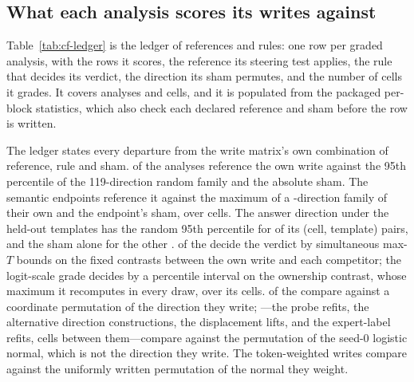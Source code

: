 \documentclass{article}
\begin{document}
\subsection{What each analysis scores its writes against}
\label{app:cf-ledger}

Table~\ref{tab:cf-ledger} is the ledger of references and rules: one row per graded analysis, with the rows it scores, the reference its steering test applies, the rule that decides its verdict, the direction its sham permutes, and the number of cells it grades. It covers \cfLedgerAnalyses{} analyses and \cfLedgerCells{} cells, and it is populated from the packaged per-block statistics, which also check each declared reference and sham before the row is written.

The ledger states every departure from the write matrix's own combination of reference, rule and sham. \cfLedgerFullReference{} of the \cfLedgerAnalyses{} analyses reference the own write against the 95th percentile of the 119-direction random family and the absolute sham. The semantic endpoints reference it against the maximum of a \cfSemLedgerRandom{}-direction family of their own and the endpoint's sham, over \cfSemLedgerCells{} cells. The answer direction under the held-out templates has the random 95th percentile for \cfAnsdirtRefPairs{} of its \cfAnsdirtLedgerPairs{} (cell, template) pairs, and the sham alone for the other \cfAnsdirtShamPairs{}. \cfLedgerMaxT{} of the \cfLedgerAnalyses{} decide the verdict by simultaneous max-$T$ bounds on the fixed contrasts between the own write and each competitor; the logit-scale grade decides by a percentile interval on the ownership contrast, whose maximum it recomputes in every draw, over its \cfLedgerPercentileCells{} cells. \cfLedgerOwnSham{} of the \cfLedgerAnalyses{} compare against a coordinate permutation of the direction they write; \cfLedgerSeedShamWord{}---the probe refits, the alternative direction constructions, the displacement lifts, and the expert-label refits, \cfLedgerSeedShamCells{} cells between them---compare against the permutation of the seed-0 logistic normal, which is not the direction they write. The token-weighted writes compare against the uniformly written permutation of the normal they weight.
\end{document}
